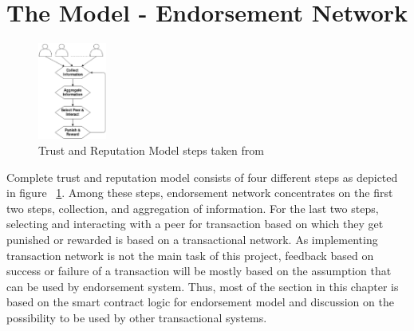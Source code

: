 \section{The Model - Endorsement Network}\label{sec:endorsementModel}
\begin{figure}
	\begin{center}
		\includegraphics[width=0.2\textwidth]{Images/TrustAndReputationSteps.eps}
		\caption{Trust and Reputation Model steps taken from \cite{marmol2009security}}
		\label{fig:truststep}
	\end{center}
\end{figure}
Complete trust and reputation model consists of four different steps as
depicted in figure ~\ref{fig:truststep}. Among these steps, endorsement network
concentrates on the first two steps, collection, and aggregation of
information. For the last two steps, selecting and interacting with a peer for
transaction based on which they get punished or rewarded is based on a
transactional network. 
As implementing transaction network is not the main task
of this project, feedback based on success or failure of a transaction will be
mostly based on the assumption that can be used by endorsement system.  Thus,
most of the section in this chapter is based on the smart contract logic for
endorsement model and discussion on the possibility to be used by other
transactional systems. 

